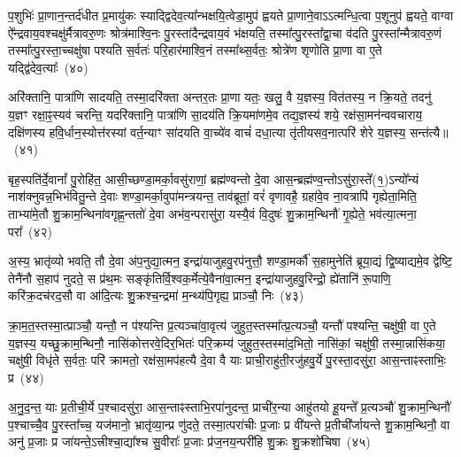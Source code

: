 प॒शुभिः॑ प्रा॒णान॒न्तर्द॑धीत प्र॒मायु॑कः स्याद्द्विदेव॒त्या᳚न्भक्षयि॒त्वेडा॒मुप॑ ह्वयते प्रा॒णाने॒वा\-ऽऽ\-त्मन्धि॒त्वा प॒शूनुप॑ ह्वयते॒ वाग्वा ऐ᳚न्द्रवाय॒वश्चक्षु॑र्मैत्रावरु॒णः श्रोत्र॑माश्वि॒नः पु॒रस्ता॑दैन्द्रवाय॒वं भ॑क्षयति॒ तस्मा᳚त्पु॒रस्ता᳚द्वा॒चा व॑दति पु॒रस्ता᳚न्मैत्रावरु॒णं तस्मा᳚त्पु॒रस्ता॒च्चक्षु॑षा पश्यति स॒र्वतः॑ परि॒हार॑माश्वि॒नं तस्मा᳚थ्स॒र्वतः॒ श्रोत्रे॑ण शृणोति प्रा॒णा वा ए॒ते यद्द्वि॑देव॒त्याः᳚~(४०)\ip

अरि॑क्तानि॒ पात्रा॑णि सादयति॒ तस्मा॒दरि॑क्ता अन्तर॒तः प्रा॒णा यतः॒ खलु॒ वै य॒ज्ञस्य॒ वित॑तस्य॒ न क्रि॒यते॒ तदनु॑ य॒ज्ञꣳ रक्षा॒ꣴ॒स्यव॑ चरन्ति॒ यदरि॑क्तानि॒ पात्रा॑णि सा॒दय॑ति क्रि॒यमा॑णमे॒व तद्य॒ज्ञस्य॑ शये॒ रक्ष॑सा॒मन॑न्ववचाराय॒ दक्षि॑णस्य हवि॒र्धान॒स्योत्त॑रस्यां वर्त॒न्याꣳ सा॑दयति वा॒च्ये॑व वाचं॑ दधा॒त्या तृ॑तीय\-सव॒नात्परि॑ शेरे य॒ज्ञस्य॒ सन्त॑त्यै॥~(४१)\ip

{\anuvakamend[{म॒नु॒ष्य॒च॒रावु॑दपा॒त्रमु॑प॒ह्वये॑त द्विदेव॒त्याः᳚ षट्च॑त्वारिꣳशच्च}]}

बृह॒स्पति॑र्दे॒वानां᳚ पु॒रोहि॑त॒ आसी॒च्छण्डा॒मर्का॒वसु॑राणां॒ ब्रह्म॑ण्वन्तो दे॒वा आस॒न्ब्रह्म॑ण्व॒न्तो\-ऽसु॑रा॒स्ते᳚(१॒)\-ऽन्यो᳚न्यं नाश॑क्नुवन्न॒भिभ॑वितु॒न्ते दे॒वाः शण्डा॒मर्का॒वुपा॑मन्त्रयन्त॒ ताव॑ब्रूतां॒ वरं॑ वृणावहै॒ ग्रहा॑वे॒व ना॒वत्रापि॑ गृह्येता॒मिति॒ ताभ्या॑मे॒तौ शु॒क्राम॒न्थिना॑वगृह्ण॒न्ततो॑ दे॒वा अभ॑व॒न्परासु॑रा॒ यस्यै॒वं वि॒दुषः॑ शु॒क्राम॒न्थिनौ॑ गृ॒ह्येते॒ भव॑त्या॒त्मना॒ परा᳚~(४२)\ip

अ॒स्य॒ भ्रातृ॑व्यो भवति॒ तौ दे॒वा अ॑प॒नुद्या॒त्मन॒ इन्द्रा॑याजुहवु॒रप॑नुत्तौ॒ शण्डा॒मर्कौ॑ स॒हामुनेति॑ ब्रूया॒द्यं द्वि॒ष्याद्यमे॒व द्वेष्टि॒ तेनै॑नौ स॒हाप॑ नुदते॒ स प्र॑थ॒मः सङ्कृ॑तिर्वि॒श्वक॒र्मेत्ये॒वैना॑वा॒त्मन॒ इन्द्रा॑याजुहवु॒रिन्द्रो॒ ह्ये॑तानि॑ रू॒पाणि॒ करि॑क्र॒दच॑रद॒सौ वा आ॑दि॒त्यः शु॒क्रश्च॒न्द्रमा॑ म॒न्थ्य॑पि॒गृह्य॒ प्राञ्चौ॒ निः~(४३)\ip

क्रा॒म॒त॒स्तस्मा॒त्प्राञ्चौ॒ यन्तौ॒ न प॑श्यन्ति प्र॒त्यञ्चा॑वा॒वृत्य॑ जुहुत॒स्तस्मा᳚त्प्र॒त्यञ्चौ॒ यन्तौ॑ पश्यन्ति॒ चक्षु॑षी॒ वा ए॒ते य॒ज्ञस्य॒ यच्छु॒क्राम॒न्थिनौ॒ नासि॑कोत्तरवे॒दिर॒भितः॑ परि॒क्रम्य॑ जुहुत॒स्तस्मा॑द॒भितो॒ नासि॑कां॒ चक्षु॑षी॒ तस्मा॒न्नासि॑कया॒ चक्षु॑षी॒ विधृ॑ते स॒र्वतः॒ परि॑ क्रामतो॒ रक्ष॑सा॒मप॑हत्यै दे॒वा वै याः प्राची॒राहु॑ती॒रजु॑हवु॒र्ये पु॒रस्ता॒दसु॑रा॒ आस॒न्ताꣴस्ताभिः॒ प्र~(४४)\ip

अ॒नु॒द॒न्त॒ याः प्र॒तीची॒र्ये प॒श्चादसु॑रा॒ आस॒न्ताꣴस्ताभि॒रपा॑नुदन्त॒ प्राची॑र॒न्या आहु॑तयो हू॒यन्ते᳚ प्र॒त्यञ्चौ॑ शु॒क्राम॒न्थिनौ॑ प॒श्चाच्चै॒व पु॒रस्ता᳚च्च॒ यज॑मानो॒ भ्रातृ॑व्या॒न्प्र णु॑दते॒ तस्मा॒त्परा॑चीः प्र॒जाः प्र वी॑यन्ते प्र॒तीची᳚र्जायन्ते शु॒क्राम॒न्थिनौ॒ वा अनु॑ प्र॒जाः प्र जा॑यन्ते॒\-ऽत्त्रीश्चा॒द्या᳚श्च सु॒वीराः᳚ प्र॒जाः प्र॑ज॒नय॒न्परी॑हि शु॒क्रः शु॒क्रशो॑चिषा~(४५)\ip

